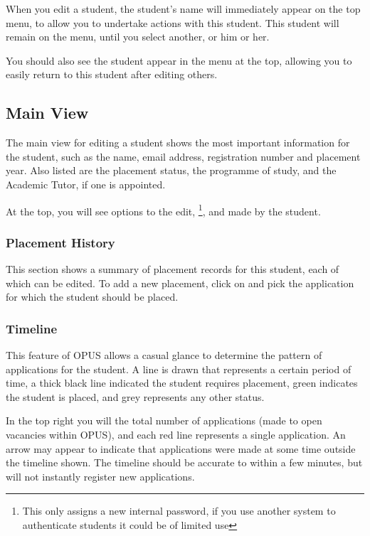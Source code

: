 \documentclass[12 pt]{book}
\begin{document}
When you edit a student, the student's name will immediately appear on the 
top menu, to allow you to undertake actions with this student. This student
will remain on the menu, until you select another, or  him or her.

You should also see the student appear in the  menu at the top,
allowing you to easily return to this student after editing others.

\subsection{Main View}

The main view for editing a student shows the most important information for
the student, such as the name, email address, registration number and placement
year. Also listed are the placement status, the programme of study, and the
Academic Tutor, if one is appointed.

At the top, you will see options to  the edit, \footnote{This only assigns a new internal password, if you use
another system to authenticate students it could be of limited use}, and
 made by the student.

\subsubsection{Placement History}

This section shows a summary of placement records for this student, each of
which can be edited. To add a new placement, click on 
and pick the application for which the student should be placed.

\subsubsection{Timeline}

This feature of OPUS allows a casual glance to determine the pattern of
applications for the student. A line is drawn that represents a certain
period of time, a thick black line indicated the student requires placement,
green indicates the student is placed, and grey represents any other 
status.

In the top right you will the total number of applications (made to open
vacancies within OPUS), and each red line represents a single application. An
arrow may appear to indicate that applications were made at some time outside
the timeline shown. The timeline should be accurate to within a few minutes,
but will not instantly register new applications.
\end{document}
